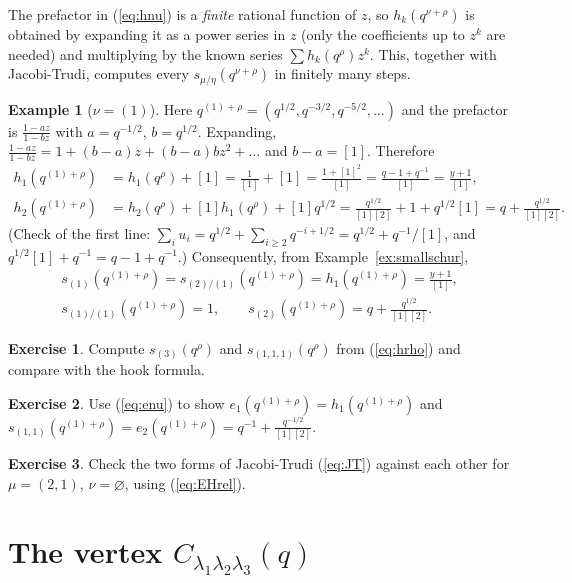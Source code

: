 \documentclass[11pt]{article}
\theoremstyle{plain}
\theoremstyle{definition}
\newtheorem{example}[theorem]{Example}
\newtheorem{exercise}{Exercise}[section]
\theoremstyle{remark}
\newcommand{\qrho}{q^{\rho}}
\newcommand{\qlr}[1]{q^{#1+\rho}}
\newcommand{\es}{\varnothing}
\begin{document}
The prefactor in (\ref{eq:hnu}) is a \textit{finite} rational function of $z$, so $h_k(\qlr\nu)$ is
obtained by expanding it as a power series in $z$ (only the coefficients up to $z^k$ are
needed) and multiplying by the known series $\sum h_k(\qrho)z^k$. This, together with
Jacobi-Trudi, computes every $s_{\mu/\eta}(\qlr\nu)$ in finitely many steps.

\begin{example}[$\nu=(1)$]\label{ex:h1nu}
Here $\qlr{(1)}=(q^{1/2},q^{-3/2},q^{-5/2},\ldots)$ and the prefactor is
$\frac{1-az}{1-bz}$ with $a=q^{-1/2}$, $b=q^{1/2}$. Expanding,
$\frac{1-az}{1-bz}=1+(b-a)z+(b-a)bz^2+\ldots$ and $b-a=[1]$. Therefore
\begin{align}
h_1(\qlr{(1)})&=h_1(\qrho)+[1]=\frac1{[1]}+[1]=\frac{1+[1]^2}{[1]}=\frac{q-1+q^{-1}}{[1]}=\frac{y+1}{[1]},\\
h_2(\qlr{(1)})&=h_2(\qrho)+[1]h_1(\qrho)+[1]q^{1/2}=\frac{q^{1/2}}{[1][2]}+1+q^{1/2}[1]
=q+\frac{q^{1/2}}{[1][2]} .
\end{align}
(Check of the first line: $\sum_iu_i=q^{1/2}+\sum_{i\ge2}q^{-i+1/2}=q^{1/2}+q^{-1}/[1]$, and
$q^{1/2}[1]+q^{-1}=q-1+q^{-1}$.) Consequently, from Example~\ref{ex:smallschur},
\begin{multline}
s_{(1)}(\qlr{(1)})=s_{(2)/(1)}(\qlr{(1)})=h_1(\qlr{(1)})=\frac{y+1}{[1]},\\
s_{(1)/(1)}(\qlr{(1)})=1,\qquad s_{(2)}(\qlr{(1)})=q+\frac{q^{1/2}}{[1][2]} .
\end{multline}
\end{example}

\begin{exercise}\label{ex:schur1}
Compute $s_{(3)}(\qrho)$ and $s_{(1,1,1)}(\qrho)$ from (\ref{eq:hrho}) and compare with the
hook formula.
\end{exercise}

\begin{exercise}\label{ex:schur2}
Use (\ref{eq:enu}) to show $e_1(\qlr{(1)})=h_1(\qlr{(1)})$ and
$s_{(1,1)}(\qlr{(1)})=e_2(\qlr{(1)})=q^{-1}+\frac{q^{-1/2}}{[1][2]}$.
\end{exercise}

\begin{exercise}\label{ex:schur3}
Check the two forms of Jacobi-Trudi (\ref{eq:JT}) against each other for $\mu=(2,1)$, $\nu=\es$,
using (\ref{eq:EHrel}).
\end{exercise}

\section{The vertex \texorpdfstring{$C_{\lambda_1\lambda_2\lambda_3}(q)$}{C(q)}}\label{sec:vertex}
\end{document}
